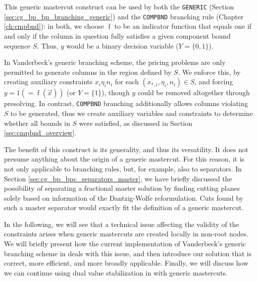 This generic mastercut construct can be used by both the \texttt{GENERIC} (Section \ref{sec:cg_bp_bp_branching_generic}) and the \texttt{COMPBND} branching rule (Chapter \ref{ch:cmpbnd}): in both, we choose $\operatorname{f}$ to be an indicator function that equals one if and only if the column in question fully satisfies a given component bound sequence $S$. Thus, $y$ would be a binary decision variable ($Y = \{0, 1\}$).

In Vanderbeck's generic branching scheme, the pricing problems are only permitted to generate columns in the region defined by $S$. We enforce this, by creating auxiliary constraints $x_i \eta_i n_i$ for each $\left( x_{*,i}, \eta_i, n_i \right) \in S$, and forcing $y = 1 (= \operatorname{f}(\vec{x}))$ (or $Y = \{1\}$), though $y$ could be removed altogether through presolving. In contrast, \texttt{COMPBND} branching additionally allows columns violating $S$ to be generated, thus we create auxiliary variables and constraints to determine whether all bounds in $S$ were satisfied, as discussed in Section \ref{sec:cmpbnd_overview}.

The benefit of this construct is its generality, and thus its versatility. It does not presume anything about the origin of a generic mastercut. For this reason, it is not only applicable to branching rules, but, for example, also to separators. In Section \ref{sec:cg_bp_bpc_separators_master}, we have briefly discussed the possibility of separating a fractional master solution by finding cutting planes solely based on information of the Dantzig-Wolfe reformulation. Cuts found by such a master separator would exactly fit the definition of a generic mastercut.

In the following, we will see that a technical issue affecting the validity of the constraints arises when generic mastercuts are created locally in non-root nodes. We will briefly present how the current implementation of Vanderbeck's generic branching scheme in \GCG{} deals with this issue, and then introduce our solution that is correct, more efficient, and more broadly applicable. Finally, we will discuss how we can continue using dual value stabilization in \GCG{} with generic mastercuts.


